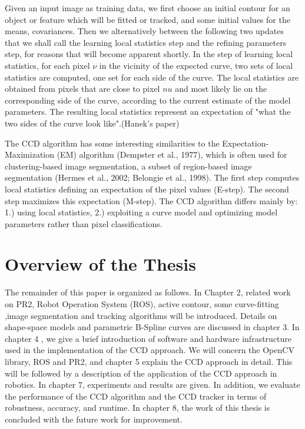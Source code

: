 Given an input image as training data, we first choose an initial
contour for an object or feature which will be fitted or tracked, and
some initial values for the means, covariances. Then we alternatively
between the following two updates that we shall call the learning
local statistics step and the refining parameters step, for reasons
that will become apparent shortly.
In the step of learning local statistics, for each pixel $\nu$ in the
vicinity of the expected curve, two sets of local statistics
are computed, one set for each side of the curve. The local statistics are obtained from
pixels that are close to pixel $nu$ and most likely lie on the corresponding side of the curve,
according to the current estimate of the model parameters. The resulting local statistics
represent an expectation of "what the two sides of the curve look
like".(Hanek's paper)

The CCD algorithm has some interesting similarities to the Expectation-Maximization
(EM) algorithm (Dempster et al., 1977), which is often used for clustering-based image
segmentation, a subset of region-based image segmentation (Hermes et al., 2002; Belongie
et al., 1998). The first step computes local statistics defining an expectation of the pixel
values (E-step). The second step maximizes this expectation
(M-step). The CCD algorithm differs mainly by: 1.) using local
statistics, 2.) exploiting a curve model and optimizing model
parameters rather than pixel classifications.


\section{Overview of the Thesis}
\label{sec:overview}
The remainder of this paper is organized as follows. In Chapter 2,
related work on PR2, Robot Operation System (ROS), active contour,
some curve-fitting ,image segmentation and tracking algorithms will be
introduced. Details on shape-space models and parametric
B-Spline curves are discussed in chapter 3. In chapter 4 , we give a brief introduction of software
and hardware infrastructure used in the implementation of the CCD
approach. We will concern the OpenCV library, ROS and PR2, and chapter
5 explain the CCD approach in detail. This will be followed by a
description of the application of the CCD approach in
robotics. In chapter 7, experiments and results are given. In
addition, we evaluate the performance of the CCD algorithm and the CCD
tracker in terms of robustness, accuracy, and runtime. In chapter 8,
the work of this thesis is concluded with the future work for improvement.


